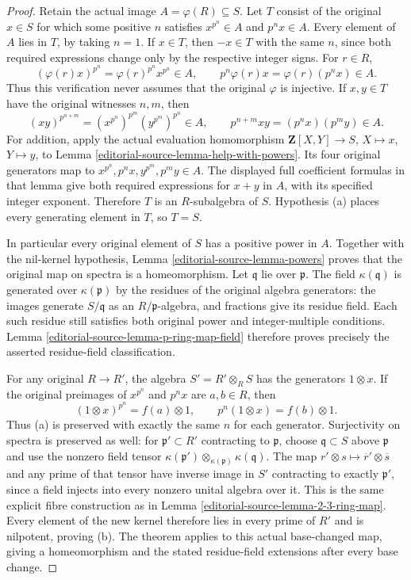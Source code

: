 \begin{proof}
Retain the actual image $A=\varphi(R)\subseteq S$.
Let $T$ consist of the original $x\in S$ for
which some positive $n$ satisfies
$x^{p^n}\in A$ and $p^n x\in A$.
Every element of $A$ lies in $T$, by taking
$n=1$. If $x\in T$, then $-x\in T$ with
the same $n$, since both required expressions
change only by the respective integer signs.
For $r\in R$,
$$
(\varphi(r)x)^{p^n}=\varphi(r)^{p^n}x^{p^n}\in A,
\qquad
p^n\varphi(r)x=\varphi(r)(p^n x)\in A.
$$
Thus this verification never assumes that
the original $\varphi$ is injective.
If $x,y\in T$ have the original witnesses
$n,m$, then
$$
(xy)^{p^{n+m}}
=(x^{p^n})^{p^m}(y^{p^m})^{p^n}\in A,
\qquad
p^{n+m}xy=(p^n x)(p^m y)\in A.
$$
For addition, apply the actual evaluation
homomorphism $\mathbf Z[X,Y]\to S$,
$X\mapsto x$, $Y\mapsto y$, to Lemma
\ref{editorial-source-lemma-help-with-powers}. Its four
original generators map to
$x^{p^n},p^n x,y^{p^m},p^m y\in A$.
The displayed full coefficient formulas
in that lemma give both required expressions
for $x+y$ in $A$, with its specified
integer exponent. Therefore $T$ is an
$R$-subalgebra of $S$. Hypothesis (a)
places every generating element in $T$,
so $T=S$.

In particular every original element
of $S$ has a positive power in $A$.
Together with the nil-kernel hypothesis,
Lemma \ref{editorial-source-lemma-powers} proves that
the original map on spectra is a
homeomorphism. Let $\mathfrak q$ lie
over $\mathfrak p$. The field
$\kappa(\mathfrak q)$ is generated over
$\kappa(\mathfrak p)$ by the residues
of the original algebra generators:
the images generate $S/\mathfrak q$
as an $R/\mathfrak p$-algebra, and
fractions give its residue field.
Each such residue still satisfies
both original power and integer-multiple
conditions. Lemma \ref{editorial-source-lemma-p-ring-map-field}
therefore proves precisely the asserted
residue-field classification.

For any original $R\to R'$, the
algebra $S'=R'\otimes_R S$ has the
generators $1\otimes x$. If the
original preimages of $x^{p^n}$ and
$p^n x$ are $a,b\in R$, then
$$
(1\otimes x)^{p^n}=f(a)\otimes1,
\qquad p^n(1\otimes x)=f(b)\otimes1.
$$
Thus (a) is preserved with exactly
the same $n$ for each generator.
Surjectivity on spectra is preserved
as well: for $\mathfrak p'\subset R'$
contracting to $\mathfrak p$, choose
$\mathfrak q\subset S$ above
$\mathfrak p$ and use the nonzero
field tensor
$\kappa(\mathfrak p')\otimes_{\kappa(\mathfrak p)}\kappa(\mathfrak q)$.
The map $r'\otimes s\mapsto
\overline r'\otimes\overline s$
and any prime of that tensor have
inverse image in $S'$ contracting
to exactly $\mathfrak p'$, since
a field injects into every nonzero
unital algebra over it. This is
the same explicit fibre construction
as in Lemma \ref{editorial-source-lemma-2-3-ring-map}.
Every element of the new kernel
therefore lies in every prime of
$R'$ and is nilpotent, proving (b).
The theorem applies to this actual
base-changed map, giving a
homeomorphism and the stated
residue-field extensions after
every base change.


\end{proof}
